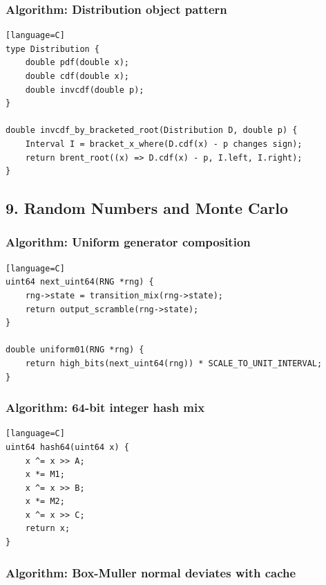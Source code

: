 \documentclass[11pt]{article}
\begin{document}
\subsubsection{Algorithm: Distribution object pattern}\label{algorithm-distribution-object-pattern}

\begin{verbatim}[language=C]
type Distribution {
    double pdf(double x);
    double cdf(double x);
    double invcdf(double p);
}

double invcdf_by_bracketed_root(Distribution D, double p) {
    Interval I = bracket_x_where(D.cdf(x) - p changes sign);
    return brent_root((x) => D.cdf(x) - p, I.left, I.right);
}
\end{verbatim}

\subsection{9. Random Numbers and Monte Carlo}\label{random-numbers-and-monte-carlo}

\subsubsection{Algorithm: Uniform generator composition}\label{algorithm-uniform-generator-composition}

\begin{verbatim}[language=C]
uint64 next_uint64(RNG *rng) {
    rng->state = transition_mix(rng->state);
    return output_scramble(rng->state);
}

double uniform01(RNG *rng) {
    return high_bits(next_uint64(rng)) * SCALE_TO_UNIT_INTERVAL;
}
\end{verbatim}

\subsubsection{Algorithm: 64-bit integer hash mix}\label{algorithm-64-bit-integer-hash-mix}

\begin{verbatim}[language=C]
uint64 hash64(uint64 x) {
    x ^= x >> A;
    x *= M1;
    x ^= x >> B;
    x *= M2;
    x ^= x >> C;
    return x;
}
\end{verbatim}

\subsubsection{Algorithm: Box-Muller normal deviates with cache}\label{algorithm-box-muller-normal-deviates-with-cache}
\end{document}
